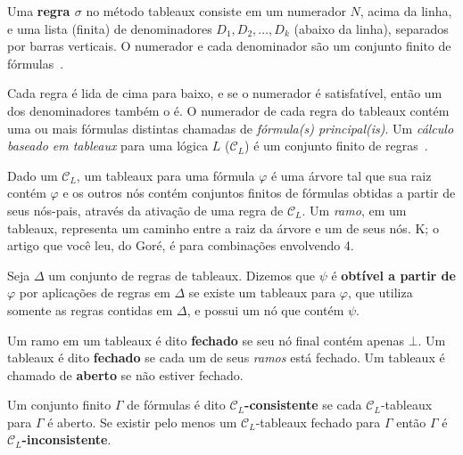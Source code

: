 \begin{definition}
    Uma \textbf{regra $\sigma$} no método tableaux consiste em um numerador $N$,
    acima da linha, e uma lista (finita) de denominadores $D_1, D_2,
    \ldots, D_k$ (abaixo da linha), separados por barras verticais. O numerador e
    cada denominador são um conjunto finito de fórmulas~\cite{tableaux:def}.
\end{definition}
 
Cada regra é lida de cima para baixo, e se o numerador é satisfatível,
então um dos denominadores também o é. O numerador de cada regra do
tableaux contém uma ou mais fórmulas distintas chamadas de \textit{fórmula(s)
principal(is)}. Um \textit{cálculo baseado em tableaux} para uma lógica $L$ ($\mathcal{C}_L$) 
é um conjunto finito de regras~\cite{clausal_tableaux}.

Dado um $\mathcal{C}_L$, um tableaux para uma fórmula $\varphi$ é uma árvore tal
que sua raiz contém $\varphi$ e os outros nós contém conjuntos finitos de
fórmulas obtidas a partir de seus nós-pais, através da ativação de uma regra de
$\mathcal{C}_L$. Um \textit{ramo}, em um tableaux, representa um caminho entre a
raiz da árvore e um de seus nós. %
K; o artigo que você leu, do Goré, é para combinações envolvendo 4.

\begin{definition}
Seja $\Delta$ um conjunto de regras de tableaux. Dizemos que $\psi$ é
\textbf{obtível a partir de} $\varphi$ por aplicações de regras em $\Delta$ se existe
um tableaux para $\varphi$, que utiliza somente as regras contidas em $\Delta$, e possui
um nó que contém $\psi$. 
\end{definition}

\begin{definition}
    Um ramo em um tableaux é dito \textbf{fechado} se seu nó final
    contém apenas $\bot$. Um tableaux é dito \textbf{fechado} se cada um de seus
    \textit{ramos} está fechado. Um tableaux é chamado de \textbf{aberto} se
    não estiver fechado.
\end{definition}

\begin{definition}
    Um conjunto finito $\Gamma$ de fórmulas é dito
    \textbf{$\mathcal{C}_L$-consistente} se cada $\mathcal{C}_L$-tableaux para $\Gamma$
    é aberto. Se existir pelo menos um $\mathcal{C}_L$-tableaux fechado para $\Gamma$
    então $\Gamma$ é \textbf{$\mathcal{C}_L$-inconsistente}.
\end{definition}


